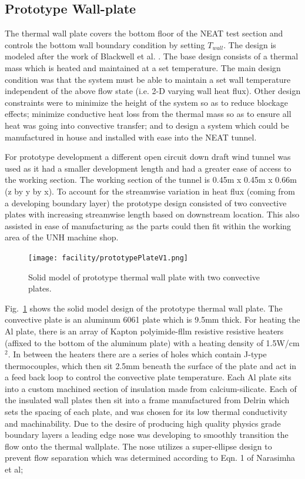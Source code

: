 \subsection{Prototype Wall-plate}
The thermal wall plate covers the bottom floor of the NEAT test section and controls the bottom wall boundary condition by setting $T_{wall}$.
The design is modeled after the work of Blackwell et al. \cite{Blackwell1972}.
The base design consists of a thermal mass which is heated and maintained at a set temperature.
The main design condition was that the system must be able to maintain a set wall temperature independent of the above flow state (i.e. 2-D varying wall heat flux).
Other design constraints were to minimize the height of the system so as to reduce blockage effects; minimize conductive heat loss from the thermal mass so as to ensure all heat was going into convective transfer; and to design a system which could be manufactured in house and installed with ease into the NEAT tunnel.

For prototype development a different open circuit down draft wind tunnel was used as it had a smaller development length and had a greater ease of access to the working section.
The working section of the tunnel is 0.45m x 0.45m x 0.66m (z by y by x).
To account for the streamwise variation in heat flux (coming from a developing boundary layer) the prototype design consisted of two convective plates with increasing streamwise length based on downstream location.
This also assisted in ease of manufacturing as the parts could then fit within the working area of the UNH machine shop.\\

\begin{figure}[h!]
\centering
\texttt{[image: facility/prototypePlateV1.png]}
\caption{\footnotesize Solid model of prototype thermal wall plate with two convective plates.} 
\label{fig:prototype}
\end{figure}

Fig.~\ref{fig:prototype} shows the solid model design of the prototype thermal wall plate.
The convective plate is an aluminum 6061 plate which is 9.5mm thick.
For heating the Al plate, there is an array of Kapton polyimide-fllm resistive resistive heaters (affixed to the bottom of the aluminum plate) with a heating density of 1.5W/cm$^2$.
In between the heaters there are a series of holes which contain J-type thermocouples, which then sit 2.5mm beneath the surface of the plate and act in a feed back loop to control the convective plate temperature.
Each Al plate sits into a custom machined section of insulation made from calcium-silicate.
Each of the insulated wall plates then sit into a frame manufactured from Delrin which sets the spacing of each plate, and was chosen for its low thermal conductivity and machinability.
Due to the desire of producing high quality physics grade boundary layers a leading edge nose was developing to smoothly transition the flow onto the thermal wallplate.
The nose utilizes a super-ellipse design to prevent flow separation \cite{R.Narasimha1994} which was determined according to Eqn. 1 of Narasimha et al;

